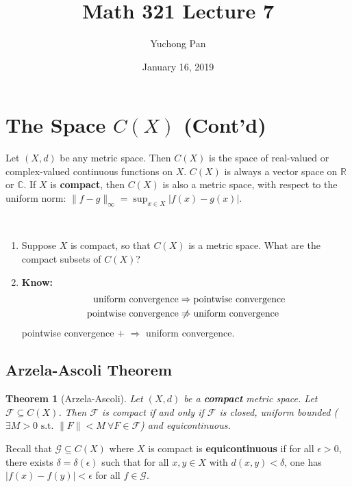 \documentclass[letterpaper, reqno,11pt]{article}
\newcommand{\RR}{\mathbb{R}}
\newcommand{\CC}{\mathbb{C}}
\begin{document}
\title{Math 321 Lecture 7}
\author{Yuchong Pan}
\date{January 16, 2019}
\newtheorem{thm}{Theorem}
\newtheorem{defn}{Definition}
\newtheorem*{remark}{Remark}
\newtheorem{claim}{Claim}
\newtheorem{cor}{Corollary}
\newtheorem{lemma}{Lemma}
\maketitle
%

\section{The Space $C(X)$ (Cont'd)}

Let $(X, d)$ be any metric space. Then $C(X)$ is the space of real-valued or complex-valued continuous functions on $X$. $C(X)$ is always a vector space on $\RR$ or $\CC$. If $X$ is {\bf compact}, then $C(X)$ is also a metric space, with respect to the uniform norm: $\lVert f - g \rVert_\infty = \sup_{x \in X} |f(x) - g(x)|$.

~

\begin{enumerate}
\item Suppose $X$ is compact, so that $C(X)$ is a metric space. What are the compact subsets of $C(X)$?
\item {\bf Know:}
  \begin{align*}
    \text{uniform convergence} &\Rightarrow \text{pointwise convergence} \\
    \text{pointwise convergence} &\centernot\Rightarrow \text{uniform convergence}
  \end{align*}
  pointwise convergence $+$  $\Rightarrow$ uniform convergence.
\end{enumerate}

\subsection{Arzela-Ascoli Theorem}

\begin{thm}[Arzela-Ascoli] \label{thm:1}
  \normalfont Let $(X, d)$ be a {\bf compact} metric space. Let $\mathcal F \subseteq C(X)$. Then $\mathcal F$ is compact if and only if $\mathcal F$ is closed, uniform bounded ($\exists M > 0 \text{ s.t. } \lVert F \rVert < M ~ \forall F \in \mathcal F$) and equicontinuous.
\end{thm}

Recall that $\mathcal G \subseteq C(X)$ where $X$ is compact is {\bf equicontinuous} if for all $\epsilon > 0$, there exists $\delta = \delta(\epsilon)$ such that for all $x, y \in X$ with $d(x, y) < \delta$, one has $|f(x) - f(y)| < \epsilon$ for all $f \in \mathcal G$.
\end{document}
